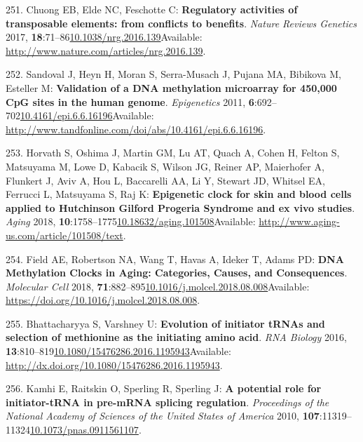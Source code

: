 \documentclass[
]{book}
\begin{document}
\leavevmode\hypertarget{ref-Chuong2017}{}%
251. Chuong EB, Elde NC, Feschotte C: \textbf{Regulatory activities of transposable elements: from conflicts to benefits}. \emph{Nature Reviews Genetics} 2017, \textbf{18}:71--86\href{https://doi.org/10.1038/nrg.2016.139}{10.1038/nrg.2016.139}Available: \url{http://www.nature.com/articles/nrg.2016.139}.

\leavevmode\hypertarget{ref-Sandoval2011}{}%
252. Sandoval J, Heyn H, Moran S, Serra-Musach J, Pujana MA, Bibikova M, Esteller M: \textbf{Validation of a DNA methylation microarray for 450,000 CpG sites in the human genome}. \emph{Epigenetics} 2011, \textbf{6}:692--702\href{https://doi.org/10.4161/epi.6.6.16196}{10.4161/epi.6.6.16196}Available: \url{http://www.tandfonline.com/doi/abs/10.4161/epi.6.6.16196}.

\leavevmode\hypertarget{ref-Horvath2018a}{}%
253. Horvath S, Oshima J, Martin GM, Lu AT, Quach A, Cohen H, Felton S, Matsuyama M, Lowe D, Kabacik S, Wilson JG, Reiner AP, Maierhofer A, Flunkert J, Aviv A, Hou L, Baccarelli AA, Li Y, Stewart JD, Whitsel EA, Ferrucci L, Matsuyama S, Raj K: \textbf{Epigenetic clock for skin and blood cells applied to Hutchinson Gilford Progeria Syndrome and ex vivo studies}. \emph{Aging} 2018, \textbf{10}:1758--1775\href{https://doi.org/10.18632/aging.101508}{10.18632/aging.101508}Available: \url{http://www.aging-us.com/article/101508/text}.

\leavevmode\hypertarget{ref-Field2018}{}%
254. Field AE, Robertson NA, Wang T, Havas A, Ideker T, Adams PD: \textbf{DNA Methylation Clocks in Aging: Categories, Causes, and Consequences}. \emph{Molecular Cell} 2018, \textbf{71}:882--895\href{https://doi.org/10.1016/j.molcel.2018.08.008}{10.1016/j.molcel.2018.08.008}Available: \url{https://doi.org/10.1016/j.molcel.2018.08.008}.

\leavevmode\hypertarget{ref-Bhattacharyya2016}{}%
255. Bhattacharyya S, Varshney U: \textbf{Evolution of initiator tRNAs and selection of methionine as the initiating amino acid}. \emph{RNA Biology} 2016, \textbf{13}:810--819\href{https://doi.org/10.1080/15476286.2016.1195943}{10.1080/15476286.2016.1195943}Available: \url{http://dx.doi.org/10.1080/15476286.2016.1195943}.

\leavevmode\hypertarget{ref-Kamhi2010}{}%
256. Kamhi E, Raitskin O, Sperling R, Sperling J: \textbf{A potential role for initiator-tRNA in pre-mRNA splicing regulation}. \emph{Proceedings of the National Academy of Sciences of the United States of America} 2010, \textbf{107}:11319--11324\href{https://doi.org/10.1073/pnas.0911561107}{10.1073/pnas.0911561107}.
\end{document}
